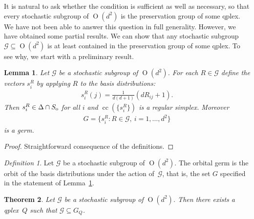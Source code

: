 \documentclass[aps,pra,superscriptaddress,10pt,tightenlines,twocolumn,nofootinbib]{revtex4}
\newtheorem{theorem}{Theorem}
\newtheorem{lemma}[theorem]{Lemma}
\theoremstyle{remark}
\newtheorem{definition}{Definition}
\newcommand{\ea}[1]{\begin{align}#1\end{align}}
\newcommand{\ps}{\Delta}
\newcommand{\so}{S_{\rm{o}}}
\newcommand{\qp}{Q}
\newcommand{\pr}{G}
\newcommand{\gp}{\mathcal{G}}
\newcommand{\qplex}{qplex}
\newcommand{\qgp}[1]{G_{#1}}
\DeclareMathOperator{\Ot}{O}
\DeclareMathOperator{\cc}{cc}
\begin{document}
It is natural to ask whether the condition is sufficient as well as necessary, so that every stochastic subgroup of $\Ot(d^2)$  is the preservation group of some \qplex.  We have not been able to answer this question in full generality.  However, we have obtained some partial results.  We can show that any stochastic subgroup $\gp \subseteq \Ot(d^2)$ is at least contained in the preservation group of some qplex.  To see why, we start with a preliminary result.
\begin{lemma}
\label{thm:assocgerm}
Let $\gp$ be a stochastic subgroup of $\Ot(d^2)$.  For each $R\in \gp$ define the vectors $s^R_i$ by applying $R$ to the basis distributions:
\ea{
s^R_i(j) = \frac{1}{d(d+1)}\left( dR_{ij} + 1\right).
}
Then  $s^R_i\in \ps\cap \so$ for all $i$ and $\cc(\{s^R_i\})$ is a regular simplex.  Moreover
\ea{
\pr = \{s^R_i \colon R \in \gp, \ i = 1, \dots, d^2\}
}
is a germ.
\end{lemma}
\begin{proof}
Straightforward consequence of the definitions.
\end{proof}
\begin{definition}
Let $\gp$ be a stochastic subgroup of $\Ot(d^2)$.  The orbital germ
is the orbit of the basis distributions under the action of~$\gp$, that
is, the set $\pr$ specified in the statement of
Lemma~\ref{thm:assocgerm}.
\end{definition}
\begin{theorem}
\label{thm:StochSgpContQgp}
Let $\gp$ be a stochastic subgroup of $\Ot(d^2)$.  Then there exists a \qplex\ $\qp$ such that $\gp \subseteq \qgp{\qp}$.
\end{theorem}
\end{document}
